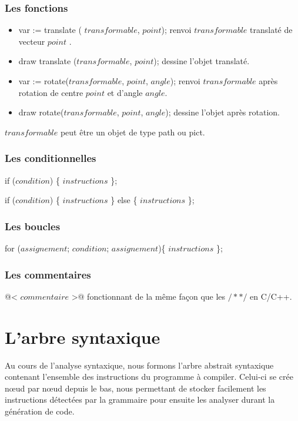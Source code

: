 \documentclass[a4paper,titlepage]{article}
\begin{document}
\subsubsection{Les fonctions}
\begin{itemize}
\item var := translate ( $transformable$, $point$);   renvoi $transformable$ translaté de vecteur $point$ .
\item draw translate ($transformable$, $point$);      dessine l'objet translaté.
\item var := rotate($transformable$, $point$, $angle$);  renvoi $transformable$ après rotation de centre $point$ et d'angle $angle$.
\item draw rotate($transformable$, $point$, $angle$);   dessine l'objet après rotation.\\
\end{itemize} 
$transformable$ peut être un objet de type path ou pict.


\subsubsection{Les conditionnelles}
if ($condition$) \{ $instructions$ \};

if ($condition$) \{ $instructions$ \} else \{ $instructions$ \};

\subsubsection{Les boucles}
for ($assignement$; $condition$; $assignement$)\{ $instructions$ \};

\subsubsection{Les commentaires}
@< $commentaire$ >@ \qquad fonctionnant de la même façon que les $/*  */$ en C/C++.

\newpage
\section{L'arbre syntaxique}

Au cours de l'analyse syntaxique, nous formons l'arbre abstrait syntaxique contenant l'ensemble des instructions du programme à compiler.
Celui-ci se crée nœud par nœud depuis le bas, nous permettant de stocker facilement les instructions détectées par la grammaire pour ensuite les analyser durant la génération de code.\\
\end{document}
